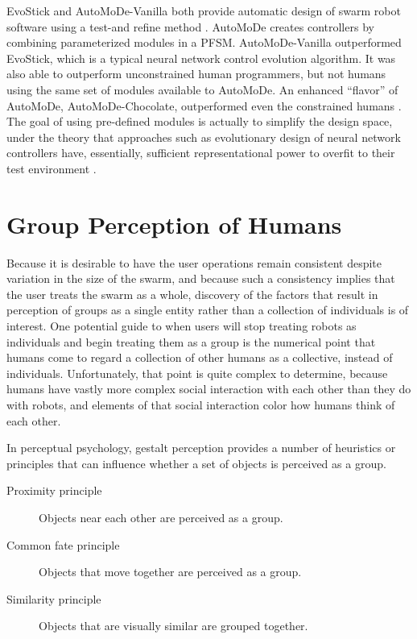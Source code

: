 EvoStick and AutoMoDe-Vanilla both provide automatic design of swarm robot software using a test-and refine method \citep{francesca2014experiment}. 
AutoMoDe creates controllers by combining parameterized modules in a PFSM. 
AutoMoDe-Vanilla outperformed EvoStick, which is a typical neural network control evolution algorithm.
It was also able to outperform unconstrained human programmers, but not humans using the same set of modules available to AutoMoDe. 
An enhanced ``flavor'' of AutoMoDe, AutoMoDe-Chocolate, outperformed even the constrained humans \citep{francesca2015automode}. 
The goal of using pre-defined modules is actually to simplify the design space, under the theory that approaches such as evolutionary design of neural network controllers have, essentially, sufficient representational power to overfit to their test environment \citep{birattari2016observing}.

\section{Group Perception of Humans} \label{section:Group_Perception_of_Humans}

Because it is desirable to have the user operations remain consistent despite variation in the size of the swarm, and because such a consistency implies that the user treats the swarm as a whole, discovery of the factors that result in perception of groups as a single entity rather than a collection of individuals is of interest.
One potential guide to when users will stop treating robots as individuals and begin treating them as a group is the numerical point that humans come to regard a collection of other humans as a collective, instead of individuals. 
Unfortunately, that point is quite complex to determine, because humans have vastly more complex social interaction with each other than they do with robots, and elements of that social interaction color how humans think of each other. 

In perceptual psychology, gestalt perception provides a number of heuristics or principles that can influence whether a set of objects is perceived as a group. 
\begin{description}
\item[Proximity principle]
Objects near each other are perceived as a group.

\item[Common fate principle] 
Objects that move together are perceived as a group.

\item[Similarity principle]
Objects that are visually similar are grouped together.
\end{description}	

